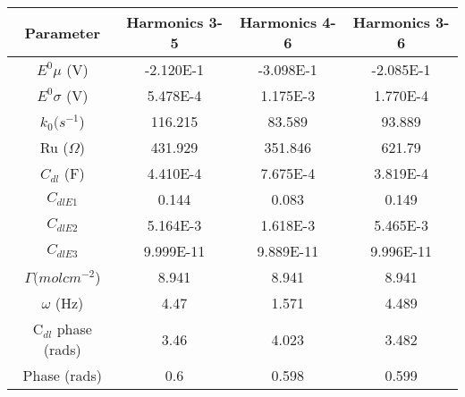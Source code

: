\documentclass[preview]{standalone}
\begin{document}
\begin{center}
\begin{tabular}{|c|c|c|c|}
\hline
Parameter & Harmonics 3-5 & Harmonics 4-6 & Harmonics 3-6\\
\hline\hline
$E^0 \mu$ (V) & -2.120E-1 & -3.098E-1 & -2.085E-1 \\
\hline
$E^0 \sigma$ (V) & 5.478E-4 & 1.175E-3 & 1.770E-4 \\
\hline
$k_0 (s^{-1}$) & 116.215 & 83.589 & 93.889 \\
\hline
Ru ($\Omega$) & 431.929 & 351.846 & 621.79 \\
\hline
$C_{dl}$ (F) & 4.410E-4 & 7.675E-4 & 3.819E-4 \\
\hline
$C_{dlE1}$& 0.144 & 0.083 & 0.149 \\
\hline
$C_{dlE2}$& 5.164E-3 & 1.618E-3 & 5.465E-3 \\
\hline
$C_{dlE3}$& 9.999E-11 & 9.889E-11 & 9.996E-11 \\
\hline
$\Gamma (mol cm^{-2}$) & 8.941 & 8.941 & 8.941 \\
\hline
$\omega$ (Hz) & 4.47 & 1.571 & 4.489 \\
\hline
C$_{dl}$ phase (rads) & 3.46 & 4.023 & 3.482 \\
\hline
Phase (rads) & 0.6 & 0.598 & 0.599 \\
\hline
\end{tabular}
\end{center}
\end{document}
